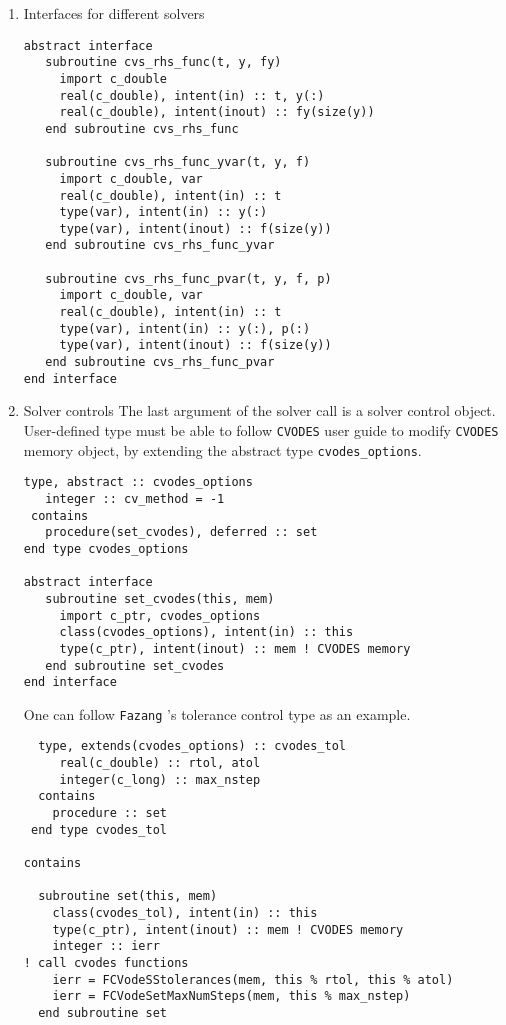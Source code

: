 \documentclass[12pt, reqno, oneside]{amsbook}
\numberwithin{equation}{chapter}
\begin{document}
\begin{enumerate}
\item Interfaces for different solvers
\label{sec:org58311fb}
\begin{verbatim}
abstract interface
   subroutine cvs_rhs_func(t, y, fy)
     import c_double
     real(c_double), intent(in) :: t, y(:)
     real(c_double), intent(inout) :: fy(size(y))
   end subroutine cvs_rhs_func

   subroutine cvs_rhs_func_yvar(t, y, f)
     import c_double, var
     real(c_double), intent(in) :: t
     type(var), intent(in) :: y(:)
     type(var), intent(inout) :: f(size(y))
   end subroutine cvs_rhs_func_yvar

   subroutine cvs_rhs_func_pvar(t, y, f, p)
     import c_double, var
     real(c_double), intent(in) :: t
     type(var), intent(in) :: y(:), p(:)
     type(var), intent(inout) :: f(size(y))
   end subroutine cvs_rhs_func_pvar
end interface
\end{verbatim}

\item Solver controls
\label{sec:org06a915d}
The last argument of the solver call is a solver control
object. User-defined type must be able to follow \texttt{CVODES} user guide
to modify \texttt{CVODES} memory object, by extending the abstract type \texttt{cvodes\_options}.
\begin{verbatim}
type, abstract :: cvodes_options
   integer :: cv_method = -1
 contains
   procedure(set_cvodes), deferred :: set
end type cvodes_options

abstract interface
   subroutine set_cvodes(this, mem)
     import c_ptr, cvodes_options
     class(cvodes_options), intent(in) :: this
     type(c_ptr), intent(inout) :: mem ! CVODES memory
   end subroutine set_cvodes
end interface
\end{verbatim}
One can follow \texttt{Fazang} 's tolerance control type as an example.
\begin{verbatim}
  type, extends(cvodes_options) :: cvodes_tol
     real(c_double) :: rtol, atol
     integer(c_long) :: max_nstep
  contains
    procedure :: set
 end type cvodes_tol

contains

  subroutine set(this, mem)
    class(cvodes_tol), intent(in) :: this
    type(c_ptr), intent(inout) :: mem ! CVODES memory
    integer :: ierr
! call cvodes functions
    ierr = FCVodeSStolerances(mem, this % rtol, this % atol)
    ierr = FCVodeSetMaxNumSteps(mem, this % max_nstep)
  end subroutine set
\end{verbatim}
\end{enumerate}
\end{document}
